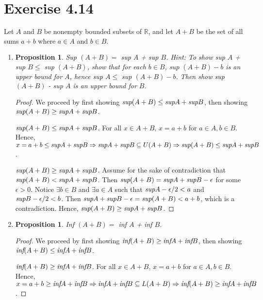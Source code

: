 \documentclass{article}
\newtheorem{proposition}[thm]{Proposition}
\begin{document}
\section*{Exercise 4.14}
Let $A$ and $B$ be nonempty bounded subsets of $\mathbb{R}$, and let $A + B$ be the set of all 
sums $a+b$ where $a\in A$ and $b\in B$.
\begin{enumerate}[label=(\alph*)]
    \item \begin{proposition}
        Sup $(A+B) = $ sup $A$ + sup $B$. Hint: To show sup $A$ + sup $B\le$ sup $(A+B)$, show that 
        for each $b \in B$, sup $(A+B)-b$ is an upper bound for $A$, hence sup $A \le$ sup 
        $(A + B) - b$. Then show sup $(A + B)$ - sup $A$ is an upper bound for $B$.
    \end{proposition}
    \begin{proof}
        We proceed by first showing $\emph{sup}(A+B)\le\emph{sup}A+\emph{sup}B$, then showing   
        $\emph{sup}(A+B)\ge\emph{sup}A+\emph{sup}B$.

        \underline{$\emph{sup}(A+B)\le\emph{sup}A+\emph{sup}B$}. For all $x\in A+B$, $x = a
        + b$ for $a\in A, b\in B$. Hence, $x = a + b \le \emph{sup}A+\emph{sup}B \Rightarrow 
        \emph{sup}A+\emph{sup}B\subseteq U(A+B)\Rightarrow \emph{sup}(A+B)\le \emph{sup}A+
        \emph{sup}B$.

        \underline{$\emph{sup}(A+B)\ge\emph{sup}A+\emph{sup}B$}. Assume for the sake of 
        contradiction that $\emph{sup}(A+B)<\emph{sup}A+\emph{sup}B$. Then $\emph{sup}(A+B) = 
        \emph{sup}A+\emph{sup}B-\epsilon$ for some $\epsilon > 0$. Notice $\exists b\in B$ and 
        $\exists a\in A$ such that $\emph{sup}A - \epsilon/2 < a$ and $\emph{sup}B - \epsilon/2 < 
        b$. Then $\emph{sup}A + \emph{sup}B - \epsilon =\emph{sup}(A+B)< a + b$, which is a 
        contradiction. Hence, $\emph{sup}(A+B)\ge\emph{sup}A+\emph{sup}B$.
    \end{proof}
    \item \begin{proposition}
        Inf $(A+B) = $ inf $A$ + inf $B$.
    \end{proposition}
    \begin{proof}
        We proceed by first showing $\emph{inf}(A+B)\ge\emph{inf}A+\emph{inf}B$, then showing   
        $\emph{inf}(A+B)\le\emph{inf}A+\emph{inf}B$.

        \underline{$\emph{inf}(A+B)\ge\emph{inf}A+\emph{inf}B$}. For all $x\in A+B$, $x = a
        + b$ for $a\in A, b\in B$. Hence, $x = a + b \ge \emph{inf}A+\emph{inf}B \Rightarrow 
        \emph{inf}A+\emph{inf}B\subseteq L(A+B)\Rightarrow \emph{inf}(A+B)\ge \emph{inf}A+
        \emph{inf}B$.


\end{proof}
\end{enumerate}
\end{document}

